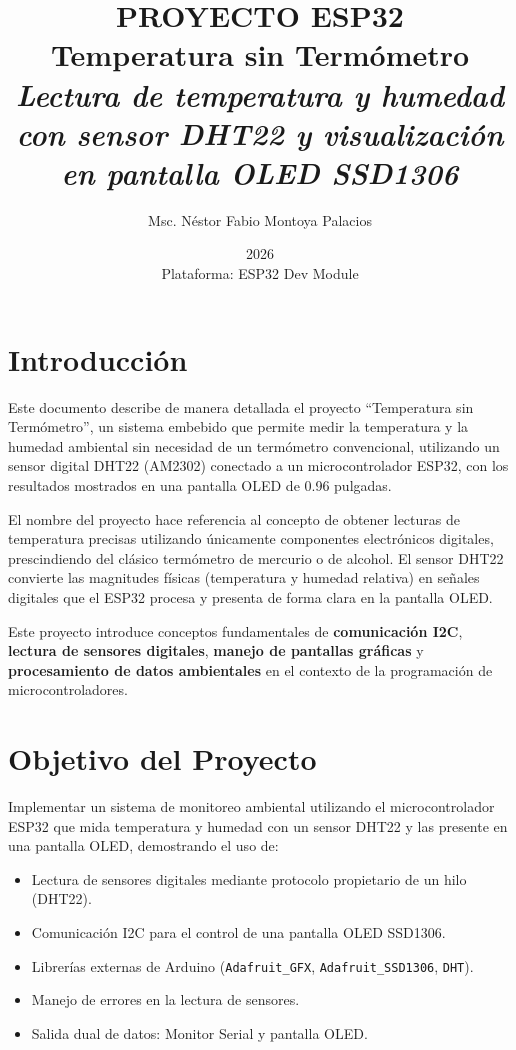 \documentclass[12pt,a4paper]{article}
\title{\Huge\textbf{PROYECTO ESP32} \\ \Large Temperatura sin Termómetro \\ \vspace{0.5cm} \normalsize \textit{Lectura de temperatura y humedad con sensor DHT22 y visualización en pantalla OLED SSD1306}}
\author{Msc. Néstor Fabio Montoya Palacios}
\date{2026 \\ \vspace{0.2cm} \small Plataforma: ESP32 Dev Module}
\begin{document}
\maketitle
\tableofcontents
\newpage

\section{Introducción}

Este documento describe de manera detallada el proyecto ``Temperatura sin Termómetro'', un sistema embebido que permite medir la temperatura y la humedad ambiental sin necesidad de un termómetro convencional, utilizando un sensor digital DHT22 (AM2302) conectado a un microcontrolador ESP32, con los resultados mostrados en una pantalla OLED de 0.96 pulgadas.

El nombre del proyecto hace referencia al concepto de obtener lecturas de temperatura precisas utilizando únicamente componentes electrónicos digitales, prescindiendo del clásico termómetro de mercurio o de alcohol. El sensor DHT22 convierte las magnitudes físicas (temperatura y humedad relativa) en señales digitales que el ESP32 procesa y presenta de forma clara en la pantalla OLED.

Este proyecto introduce conceptos fundamentales de \textbf{comunicación I2C}, \textbf{lectura de sensores digitales}, \textbf{manejo de pantallas gráficas} y \textbf{procesamiento de datos ambientales} en el contexto de la programación de microcontroladores.

\section{Objetivo del Proyecto}

Implementar un sistema de monitoreo ambiental utilizando el microcontrolador ESP32 que mida temperatura y humedad con un sensor DHT22 y las presente en una pantalla OLED, demostrando el uso de:
\begin{itemize}
    \item Lectura de sensores digitales mediante protocolo propietario de un hilo (DHT22).
    \item Comunicación I2C para el control de una pantalla OLED SSD1306.
    \item Librerías externas de Arduino (\texttt{Adafruit\_GFX}, \texttt{Adafruit\_SSD1306}, \texttt{DHT}).
    \item Manejo de errores en la lectura de sensores.
    \item Salida dual de datos: Monitor Serial y pantalla OLED.
\end{itemize}
\end{document}
